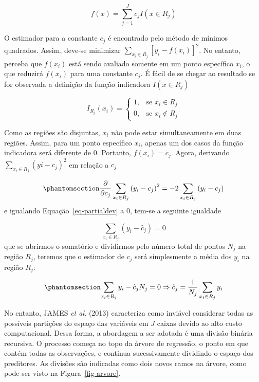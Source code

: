 \documentclass[
  12pt,
  a4paper,
]{scrreprt}
\begin{document}
\[
f\left(x\right) = \sum^J_{j=1}c_j I\left(x \in R_j \right)
\]

O estimador para a constante \(c_j\) é encontrado pelo método de mínimos
quadrados. Assim, deve-se minimizar
\(\sum_{x_i \in R_j} \left[y_i - f\left(x_i\right)\right]^2\). No
entanto, perceba que \(f\left(x_i\right)\) está sendo avaliado somente
em um ponto específico \(x_i\), o que reduzirá \(f\left(x_i\right)\)
para uma constante \(c_j\). É fácil de se chegar ao resultado se for
observada a definição da função indicadora \(I\left(x \in R_j\right)\)

\[
I_{R_j}(x_i) =
\begin{cases}
    1,& \text{se } x_i \in R_j \\
    0,& \text{se } x_i \notin R_j
\end{cases}
\]

Como as regiões são disjuntas, \(x_i\) não pode estar simultaneamente em
duas regiões. Assim, para um ponto específico \(x_i\), apenas um dos
casos da função indicadora será diferente de 0. Portanto,
\(f\left(x_i\right) = c_j\). Agora, derivando
\(\sum_{x_i \in R_j}\left(yi - c_j\right)^2\) em relação a \(c_j\)

\begin{equation}\phantomsection\label{eq-partialdev}{
\frac{\partial}{\partial{c_j}}\sum_{x_i \in R_j} \left(y_i - c_j\right)^2 = -2\sum_{x_i \in R_j} \left(y_i - c_j\right)
}\end{equation} e igualando Equação~\ref{eq-partialdev} a 0, tem-se a
seguinte igualdade

\[
\sum_{x_i \in R_j} \left(y_i - \hat{c}_j\right) = 0
\] que se abrirmos o somatório e dividirmos pelo número total de pontos
\(N_j\) na região \(R_j\), teremos que o estimador de \(c_j\) será
simplesmente a média dos \(y_i\) na região \(R_j\):

\begin{equation}\phantomsection\label{eq-estimacjdev}{
\sum_{x_i \in R_j} y_i - \hat{c}_j N_j = 0 \Rightarrow \hat{c}_j = \frac{1}{N_{j}}\sum_{x_i \in R_j} y_i
}\end{equation}

\vspace{12pt}

No entanto, JAMES \emph{et al.} (2013) caracteriza como inviável
considerar todas as possíveis partições do espaço das variáveis em \(J\)
caixas devido ao alto custo computacional. Dessa forma, a abordagem a
ser adotada é uma divisão binária recursiva. O processo começa no topo
da árvore de regressão, o ponto em que contém todas as observações, e
continua sucessivamente dividindo o espaço dos preditores. As divisões
são indicadas como dois novos ramos na árvore, como pode ser visto na
Figura~\ref{fig-arvore}.
\end{document}
